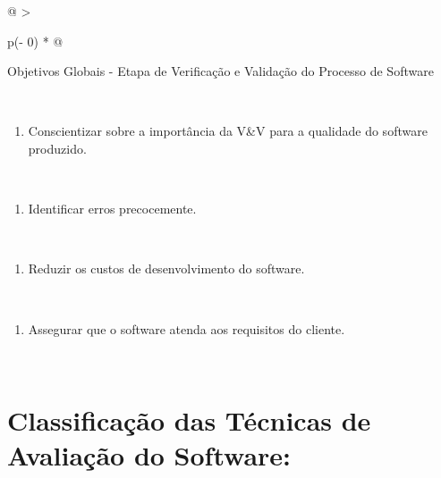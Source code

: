 \documentclass[
]{book}
\providecommand{\tightlist}{%
  \setlength{\itemsep}{0pt}\setlength{\parskip}{0pt}}
\begin{document}
\begin{longtable}[]{@{}
  >{\raggedright\arraybackslash}p{(\columnwidth - 0\tabcolsep) * }@{}}
\toprule\noalign{}
\begin{minipage}[b]{\linewidth}\raggedright
Objetivos Globais - Etapa de Verificação e Validação do Processo de Software
\end{minipage} \\
\midrule\noalign{}
\endhead
\bottomrule\noalign{}
\endlastfoot
\begin{minipage}[t]{\linewidth}\raggedright
\begin{enumerate}
\def\labelenumi{\arabic{enumi})}
\tightlist
\item
  Conscientizar sobre a importância da V\&V para a qualidade do software produzido.
\end{enumerate}
\end{minipage} \\
\begin{minipage}[t]{\linewidth}\raggedright
\begin{enumerate}
\def\labelenumi{\arabic{enumi})}
\setcounter{enumi}{1}
\tightlist
\item
  Identificar erros precocemente.
\end{enumerate}
\end{minipage} \\
\begin{minipage}[t]{\linewidth}\raggedright
\begin{enumerate}
\def\labelenumi{\arabic{enumi})}
\setcounter{enumi}{2}
\tightlist
\item
  Reduzir os custos de desenvolvimento do software.
\end{enumerate}
\end{minipage} \\
\begin{minipage}[t]{\linewidth}\raggedright
\begin{enumerate}
\def\labelenumi{\arabic{enumi})}
\setcounter{enumi}{3}
\tightlist
\item
  Assegurar que o software atenda aos requisitos do cliente.
\end{enumerate}
\end{minipage} \\
\end{longtable}

\section{Classificação das Técnicas de Avaliação do Software:}\label{classificauxe7uxe3o-das-tuxe9cnicas-de-avaliauxe7uxe3o-do-software}
\end{document}
